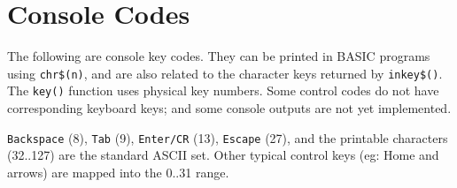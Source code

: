 \documentclass[12pt]{article}
\newcommand{\MonoSp}[1] {\fontsize{10pt}{10pt}\selectfont\texttt{#1}\normalsize}
\begin{document}



\pagebreak


\section{Console Codes}\label{console-codes}

The following are console key codes.
They can be printed in BASIC programs using \MonoSp{chr\$(n)},
and are also related to the character keys returned by \MonoSp{inkey\$()}.
The \MonoSp{key()} function uses physical key numbers.
Some control codes do not have corresponding keyboard keys;
and some console outputs are not yet implemented.
\newline

\MonoSp{Backspace} (8), \MonoSp{Tab} (9), \MonoSp{Enter/CR} (13), \MonoSp{Escape} (27),
and the printable characters (32..127) are the standard ASCII set.
Other typical control keys (eg: Home and arrows) are mapped into the 0..31 range.
\end{document}
